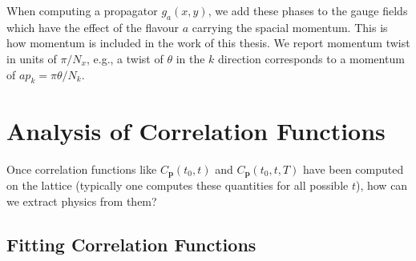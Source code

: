 When computing a propagator $g_a(x,y)$, we add these phases to the gauge fields which have the effect of the flavour $a$ carrying the spacial momentum. This is how momentum is included in the work of this thesis. We report momentum twist in units of $\pi/N_x$, e.g., a twist of $\theta$ in the $k$ direction corresponds to a momentum of $ap_k = \pi\theta/N_k$.

\section{Analysis of Correlation Functions}

Once correlation functions like $C_{\textbf{p}}(t_0,t)$ and $C_{\textbf{p}}(t_0,t,T)$ have been computed on the lattice (typically one computes these quantities for all possible $t$), how can we extract physics from them?

\subsection{Fitting Correlation Functions}
\label{sec:correlator_fits}


